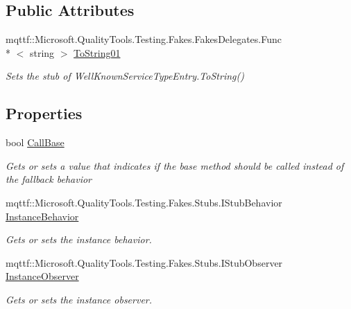 \subsection*{Public Attributes}
\begin{DoxyCompactItemize}
\item 
mqttf\-::\-Microsoft.\-Quality\-Tools.\-Testing.\-Fakes.\-Fakes\-Delegates.\-Func\\*
$<$ string $>$ \hyperlink{class_system_1_1_runtime_1_1_remoting_1_1_fakes_1_1_stub_well_known_service_type_entry_aae5d86a0df55128ff3247ecd0a16fed8}{To\-String01}
\begin{DoxyCompactList}\small\item\em Sets the stub of Well\-Known\-Service\-Type\-Entry.\-To\-String()\end{DoxyCompactList}\end{DoxyCompactItemize}
\subsection*{Properties}
\begin{DoxyCompactItemize}
\item 
bool \hyperlink{class_system_1_1_runtime_1_1_remoting_1_1_fakes_1_1_stub_well_known_service_type_entry_aaab4c8b2dd032de3d0d47b6ab2a0905b}{Call\-Base}
\begin{DoxyCompactList}\small\item\em Gets or sets a value that indicates if the base method should be called instead of the fallback behavior\end{DoxyCompactList}\item 
mqttf\-::\-Microsoft.\-Quality\-Tools.\-Testing.\-Fakes.\-Stubs.\-I\-Stub\-Behavior \hyperlink{class_system_1_1_runtime_1_1_remoting_1_1_fakes_1_1_stub_well_known_service_type_entry_aade3330acdd2ec615fec58502ca67e4e}{Instance\-Behavior}
\begin{DoxyCompactList}\small\item\em Gets or sets the instance behavior.\end{DoxyCompactList}\item 
mqttf\-::\-Microsoft.\-Quality\-Tools.\-Testing.\-Fakes.\-Stubs.\-I\-Stub\-Observer \hyperlink{class_system_1_1_runtime_1_1_remoting_1_1_fakes_1_1_stub_well_known_service_type_entry_a8ba16ca769ec1b9ec028127898d483db}{Instance\-Observer}
\begin{DoxyCompactList}\small\item\em Gets or sets the instance observer.\end{DoxyCompactList}\end{DoxyCompactItemize}


